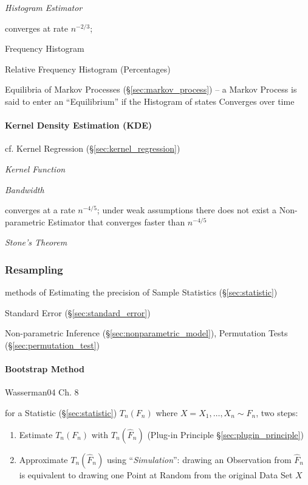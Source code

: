 \emph{Histogram Estimator}

converges at rate $n^{-2/3}$;

Frequency Histogram

Relative Frequency Histogram (Percentages)

Equilibria of Markov Processes (\S\ref{sec:markov_process}) -- a Markov Process
is said to enter an ``Equilibrium'' if the Histogram of states Converges over
time



\paragraph{Kernel Density Estimation (KDE)}\label{sec:kde}\hfill

cf. Kernel Regression (\S\ref{sec:kernel_regression})

\emph{Kernel Function}

\emph{Bandwidth}

converges at a rate $n^{-4/5}$;
under weak assumptions there does not exist a Non-parametric Estimator that
converges faster than $n^{-4/5}$

\emph{Stone's Theorem}



\subsubsection{Resampling}\label{sec:resampling}

methods of Estimating the precision of Sample Statistics (\S\ref{sec:statistic})

\fist Standard Error (\S\ref{sec:standard_error})

Non-parametric Inference (\S\ref{sec:nonparametric_model}), Permutation Tests
(\S\ref{sec:permutation_test})



\paragraph{Bootstrap Method}\label{sec:bootstrap_method}\hfill

Wasserman04 Ch. 8

for a Statistic (\S\ref{sec:statistic}) $T_n(F_n)$ where
$X = X_1, \ldots, X_n \sim F_n$, two steps:
\begin{enumerate}
  \item Estimate $T_n(F_n)$ with $T_n(\hat{F}_n)$ (Plug-in Principle
    \S\ref{sec:plugin_principle})
  \item Approximate $T_n(\hat{F}_n)$ using ``\emph{Simulation}'': drawing an
    Observation from $\hat{F}_n$ is equivalent to drawing one Point at Random
    from the original Data Set $X$
\end{enumerate}

